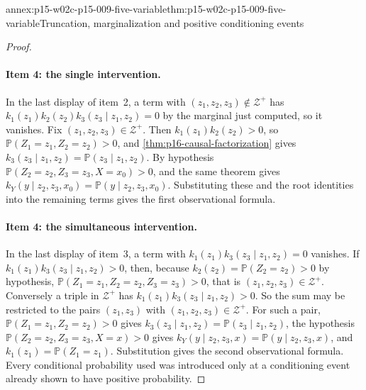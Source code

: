 \begin{annexitem}{annex:p15-w02c-p15-009-five-variable}{thm:p15-w02c-p15-009-five-variable}{Truncation, marginalization and positive conditioning events}
\begin{proof}
\paragraph{Item 4: the single intervention.} In the last display of
item~2, a term with \((z_1,z_2,z_3)\notin\mathcal Z^+\) has
\(k_1(z_1)k_2(z_2)k_3(z_3\mid z_1,z_2)=0\) by the marginal just
computed, so it vanishes. Fix \((z_1,z_2,z_3)\in\mathcal Z^+\). Then
\(k_1(z_1)k_2(z_2)>0\), so \(\mathbb P(Z_1=z_1,Z_2=z_2)>0\), and
\cref{thm:p16-causal-factorization} gives
\(k_3(z_3\mid z_1,z_2)=\mathbb P(z_3\mid z_1,z_2)\). By hypothesis
\(\mathbb P(Z_2=z_2,Z_3=z_3,X=x_0)>0\), and the same theorem gives
\(k_Y(y\mid z_2,z_3,x_0)=\mathbb P(y\mid z_2,z_3,x_0)\). Substituting
these and the root identities into the remaining terms gives the first
observational formula.

\paragraph{Item 4: the simultaneous intervention.} In the last display
of item~3, a term with \(k_1(z_1)k_3(z_3\mid z_1,z_2)=0\) vanishes. If
\(k_1(z_1)k_3(z_3\mid z_1,z_2)>0\), then, because
\(k_2(z_2)=\mathbb P(Z_2=z_2)>0\) by hypothesis,
\(\mathbb P(Z_1=z_1,Z_2=z_2,Z_3=z_3)>0\), that is
\((z_1,z_2,z_3)\in\mathcal Z^+\). Conversely a triple in
\(\mathcal Z^+\) has \(k_1(z_1)k_3(z_3\mid z_1,z_2)>0\). So the sum may
be restricted to the pairs \((z_1,z_3)\) with
\((z_1,z_2,z_3)\in\mathcal Z^+\). For such a pair,
\(\mathbb P(Z_1=z_1,Z_2=z_2)>0\) gives
\(k_3(z_3\mid z_1,z_2)=\mathbb P(z_3\mid z_1,z_2)\), the hypothesis
\(\mathbb P(Z_2=z_2,Z_3=z_3,X=x)>0\) gives
\(k_Y(y\mid z_2,z_3,x)=\mathbb P(y\mid z_2,z_3,x)\), and
\(k_1(z_1)=\mathbb P(Z_1=z_1)\). Substitution gives the second
observational formula. Every conditional probability used was
introduced only at a conditioning event already shown to have positive
probability.
\end{proof}
\end{annexitem}

